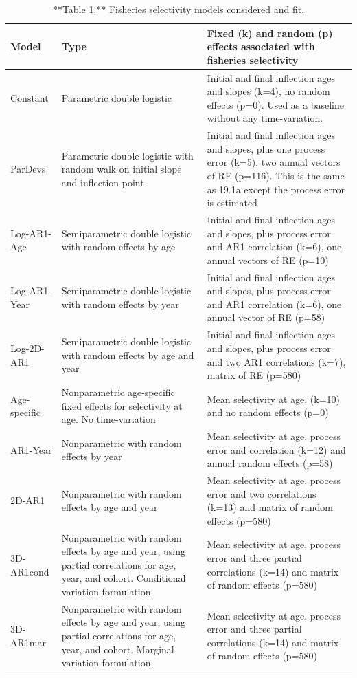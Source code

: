 \documentclass[
]{article}
\begin{document}
\begin{table}

\caption{\label{tab:unnamed-chunk-1}**Table 1.** Fisheries selectivity models considered and fit.}
\centering
\begin{tabular}[t]{l|l|l}
\hline
Model & Type & Fixed (k) and random (p) effects associated with fisheries selectivity\\
\hline
Constant & Parametric double logistic & Initial and final inflection ages and slopes (k=4), no random effects (p=0). Used as a baseline without any time-variation.\\
\hline
ParDevs & Parametric double logistic with random walk on initial slope and inflection point & Initial and final inflection ages and slopes, plus one process error (k=5), two annual vectors of RE (p=116). This is the same as 19.1a except the process error is estimated\\
\hline
Log-AR1-Age & Semiparametric double logistic with random effects by age & Initial and final inflection ages and slopes, plus process error and AR1 correlation (k=6), one annual vectors of RE (p=10)\\
\hline
Log-AR1-Year & Semiparametric double logistic with random effects by year & Initial and final inflection ages and slopes, plus process error and AR1 correlation (k=6), one annual vector of RE (p=58)\\
\hline
Log-2D-AR1 & Semiparametric double logistic with random effects by age and year & Initial and final inflection ages and slopes, plus process error and two AR1 correlations (k=7), matrix of RE (p=580)\\
\hline
Age-specific & Nonparametric age-specific fixed effects for selectivity at age. No time-variation & Mean selectivity at age, (k=10) and no random effects (p=0)\\
\hline
AR1-Year & Nonparametric with random effects by year & Mean selectivity at age, process error and correlation (k=12) and annual random effects (p=58)\\
\hline
2D-AR1 & Nonparametric with random effects by age and year & Mean selectivity at age, process error and two correlations (k=13) and matrix of random effects (p=580)\\
\hline
3D-AR1cond & Nonparametric with random effects by age and year, using partial correlations for age, year, and cohort. Conditional variation formulation & Mean selectivity at age, process error and three partial correlations (k=14) and matrix of random effects (p=580)\\
\hline
3D-AR1mar & Nonparametric with random effects by age and year, using partial correlations for age, year, and cohort. Marginal variation formulation. & Mean selectivity at age, process error and three partial correlations (k=14) and matrix of random effects (p=580)\\
\hline
\end{tabular}
\end{table}
\end{document}
